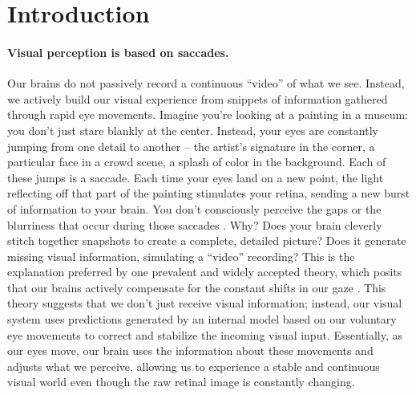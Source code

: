 \documentclass[14pt]{article}
\begin{document}
\begin{abstract}
To demonstrate the functional validity of this mechanism, we present a computational model of voluntary saccades operating within simplified simulated visual environments.
This model reproduces key features of voluntary oculomotor behavior and offers a functional reading of the influence of the fronto-parietal network, specifically the frontal eye fields (FEF) and the lateral intraparietal cortex (LIP), on the superior colliculus (SC) in humans and primates. It gives the functional counterpart of remapping, a learned relation between a view, a saccade and its expected effect, and not its neural signatures: no receptive field shifts, and stability across different starting views is yet to be tested.
\end{abstract}

\tableofcontents

\section{Introduction}
\paragraph{Visual perception is based on saccades.} 
Our brains do not passively record a continuous ``video'' of what we see.
Instead, we actively build our visual experience from snippets of information gathered through rapid eye movements.
Imagine you're looking at a painting in a museum: you don't just stare blankly at the center.
Instead, your eyes are constantly jumping from one detail to another – the artist's signature in the corner, a particular face in a crowd scene, a splash of color in the background.
Each of these jumps is a saccade.
Each time your eyes land on a new point, the light reflecting off that part of the painting stimulates your retina, sending a new burst of information to your brain.
You don't consciously perceive the gaps or the blurriness that occur during those saccades \citep{bridgemanFailureDetectDisplacement1975,burrSelectiveSuppressionMagnocellular1994,bindaVisionSaccadicEye2018}.
Why? Does your brain cleverly stitch together snapshots to create a complete, detailed picture? Does it generate missing visual information, simulating a ``video'' recording?  This is the explanation preferred by one prevalent and widely accepted theory, which posits that our brains actively compensate for the constant shifts in our gaze \citep{sommerWhatBrainStem2004,sunCorollaryDischargeOculomotor2016, cavanaughSaccadicCorollaryDischarge2016}.
This theory suggests that we don't just receive visual information; instead, our visual system uses predictions generated by an internal model based on our voluntary eye movements to correct and stabilize the incoming visual input.
Essentially, as our eyes move, our brain uses the information about these movements and adjusts what we perceive, allowing us to experience a stable and continuous visual world even though the raw retinal image is constantly changing.
\end{document}
